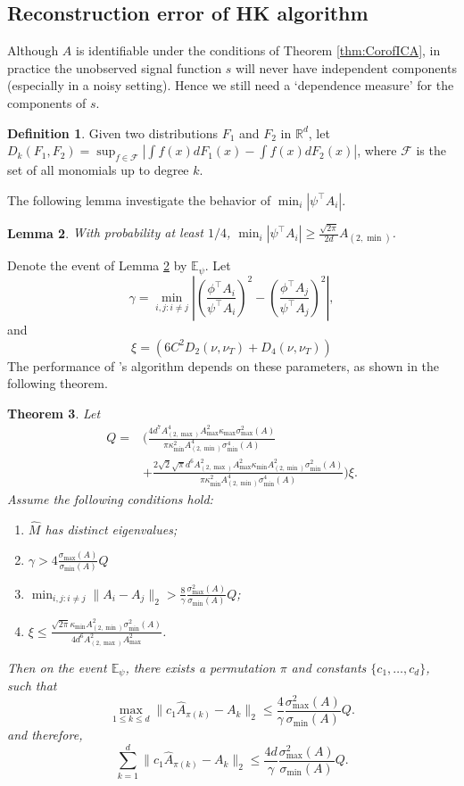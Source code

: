 \documentclass[twoside]{article}
\newcommand{\Epsi}{\mathbb{E}_{\psi}}
\newcommand{\real}{\mathbb{R}}
\newtheorem{lemma}{Lemma}[section]
\newtheorem{thm}[lemma]{Theorem}
\theoremstyle{definition}
\newtheorem{definition}[lemma]{Definition}
\begin{document}
\subsection{Reconstruction error of HK algorithm}
\label{subsec:errorHK}
Although $A$ is identifiable under the conditions of Theorem \ref{thm:CorofICA}, in practice the unobserved signal function $s$ will never have independent components (especially in a noisy setting). 
Hence we still need a `dependence measure' for the components of $s$.
\begin{definition}
Given two distributions $F_1$ and $F_2$ in $\real^d$, let $D_k(F_1,F_2) = \sup_{f\in\mathcal{F}} |\int f(x)dF_1(x) - \int f(x)dF_2(x)|$, where $\mathcal{F}$ is the set of all monomials up to degree $k$.
\end{definition} 
The following lemma investigate the behavior of $\min_i |\psi^{\top}A_i|$.
\begin{lemma}
\label{lem:dmin}
With probability at least $1/4$, $\min_i |\psi^{\top}A_i| \ge \frac{\sqrt{2\pi}}{2d}A_{(2,\min)}$.  
\end{lemma}
Denote the event of Lemma \ref{lem:dmin} by $\Epsi$. Let 
\begin{equation}
\label{def:kappa}
\gamma =  \min_{i,j: i\neq j} \left\vert \left(\frac{\phi^{\top}A_i}{\psi^{\top}A_i}\right)^2 - \left(\frac{\phi^{\top}A_j}{\psi^{\top}A_j}\right)^2 \right\vert, 
\end{equation}
and 
\[
\xi = \left( 6C^2D_2(\nu, \nu_T) + D_4(\nu, \nu_T)\right)
\]
The performance of \citet{DHsu2012}'s algorithm depends on these parameters, as shown in the following theorem.

 \begin{thm}
 \label{thm:efficiency}
Let 
 \begin{align}
 Q = &\Big(\frac{4d^7A_{(2,\max)}^4A_{\max}^2\kappa_{\max}\sigma_{\max}^2(A) }{\pi\kappa^2_{\min}A^4_{(2,\min)}\sigma_{\min}^4(A)} \\
 & + \frac{2\sqrt{2}\sqrt{\pi}d^6A_{(2,\max)}^2A_{\max}^2\kappa_{\min}A^2_{(2,\min)}\sigma_{\min}^2(A)}{\pi\kappa^2_{\min}A^4_{(2,\min)}\sigma_{\min}^4(A)} \Big)
  \xi.
 \end{align}
 Assume the following conditions hold:
 \begin{enumerate}
 \item $\widehat{M}$ has distinct eigenvalues;
 \item $\gamma > 4\frac{\sigma_{\max}(A)}{\sigma_{\min}(A)} Q$
 \item $\min_{i,j:i\neq j} \|A_i - A_j\|_2 > \frac{8}{\gamma}\frac{\sigma_{\max}^2(A)}{\sigma_{\min}(A) } Q$;
 \item $\xi \le \frac{\sqrt{2\pi}\kappa_{\min}A^2_{(2,\min)}\sigma_{\min}^2(A)}{4d^6 A_{(2,\max)}^2A_{\max}^2}$.
  \end{enumerate}
 Then on the event $\Epsi$, there exists a permutation $\pi$ and constants $\{c_1,\ldots,c_d\}$, such that
 \[
  \max_{1\le k\le d}\| c_1\widehat{A}_{\pi(k)} - A_k\|_2 \le \frac{4}{\gamma} \frac{\sigma_{\max}^2(A)}{ \sigma_{\min}(A)}Q .
  \]
  and therefore,
 \[
 \sum_{k=1}^{d}\| c_1\widehat{A}_{\pi(k)} - A_k\|_2 \le \frac{4d}{\gamma} \frac{\sigma_{\max}^2(A)}{ \sigma_{\min}(A)}Q .
 \]
 \end{thm}
\end{document}
